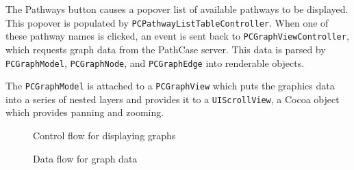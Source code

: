 The Pathways button causes a popover list of available pathways to be displayed. This popover is populated by \texttt{PCPathwayListTableController}. When one of these pathway names is clicked, an event is sent back to \texttt{PCGraphViewController}, which requests graph data from the PathCase server. This data is parsed by \texttt{PCGraphModel}, \texttt{PCGraphNode}, and \texttt{PCGraphEdge} into renderable objects.

The \texttt{PCGraphModel} is attached to a \texttt{PCGraphView} which puts the graphics data into a series of nested layers and provides it to a \texttt{UIScrollView}, a Cocoa object which provides panning and zooming.

\begin{figure}[htb]
    \caption{\label{fig:controlflow} Control flow for displaying graphs}
\end{figure}

\begin{figure}[htb]
    \caption{\label{fig:dataflow} Data flow for graph data}
\end{figure}
